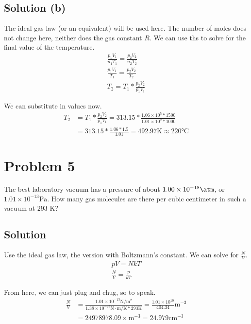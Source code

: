 \documentclass[12pt]{article}
\begin{document}
        \subsection{Solution (b)}
            The ideal gas law (or an equivalent) will be used here.
            The number of moles does not change here, neither does the gas constant $R$. 
            We can use ths to solve for the final value of the temperature.
            \begin{gather}
                \frac{p_1 V_1}{n_1 T_1} =   \frac{p_2 V_2}{n_2 T_2}\\
                \frac{p_1 V_1}{T_1} =   \frac{p_2 V_2}{T_2}\\
                T_2 =   T_1 * \frac{p_2 V_2}{p_1 V_1}
            \end{gather}

            We can substitute in values now.
            \begin{align}
                T_2 &=  T_1 * \frac{p_2 V_2}{p_1 V_1}
                    =   313.15 * \frac{1.06 \times 10^5 * 1500}{1.01 \times 10^5 * 1000}\\
                    &=  313.15 * \frac{1.06 * 1.5}{1.01}
                    =   \boxed{492.97 \unit{\kelvin} \approx 220 \unit{\celsius}}
            \end{align}

    \pagebreak
    \section{Problem 5}
        The best laboratory vacuum has a pressure of about $1.00 \times 10^{-18} \unit{\atm}$, or $1.01 \times 10^{-13} \unit{\pascal}$. 
        How many gas molecules are there per cubic centimeter in such a vacuum at 293 K?

        \subsection{Solution}
            Use the ideal gas law, the version with Boltzmann's constant.
            We can solve for $\frac{N}{V}$.
            \begin{gather}
                pV  =   NkT\\
                \frac{N}{V} =   \frac{p}{kT}
            \end{gather}

            From here, we can just plug and chug, so to speak.
            \begin{align}
                \frac{N}{V} &=  \frac{1.01 \times 10^{-13} \unit{\newton/\meter^2}}{1.38 \times 10^{-23} \unit{\newton\cdot\meter/\kelvin} * 293 \unit{\kelvin}}
                    =   \frac{1.01 \times 10^{10}}{404.34} \unit{\meter^{-3}}\\
                    &=  24978978.09 \times \unit{\meter^{-3}}
                    =   \boxed{24.979 \unit{\centi\meter^{-3}}}
            \end{align}
\end{document}
